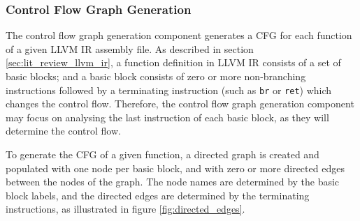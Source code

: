 
\subsubsection{Control Flow Graph Generation}
\label{sec:design_control_flow_graph_generation}

The control flow graph generation component generates a CFG for each function of a given LLVM IR assembly file. As described in section \ref{sec:lit_review_llvm_ir}, a function definition in LLVM IR consists of a set of basic blocks; and a basic block consists of zero or more non-branching instructions followed by a terminating instruction (such as \texttt{br} or \texttt{ret}) which changes the control flow. Therefore, the control flow graph generation component may focus on analysing the last instruction of each basic block, as they will determine the control flow.

To generate the CFG of a given function, a directed graph is created and populated with one node per basic block, and with zero or more directed edges between the nodes of the graph. The node names are determined by the basic block labels, and the directed edges are determined by the terminating instructions, as illustrated in figure \ref{fig:directed_edges}.


